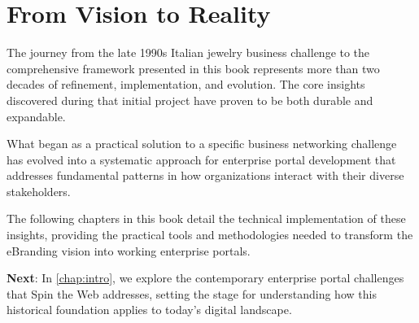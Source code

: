 \section{From Vision to Reality}

The journey from the late 1990s Italian jewelry business challenge to the comprehensive framework presented in this book represents more than two decades of refinement, implementation, and evolution. The core insights discovered during that initial project have proven to be both durable and expandable.

What began as a practical solution to a specific business networking challenge has evolved into a systematic approach for enterprise portal development that addresses fundamental patterns in how organizations interact with their diverse stakeholders.

The following chapters in this book detail the technical implementation of these insights, providing the practical tools and methodologies needed to transform the eBranding vision into working enterprise portals.

\textbf{Next}: In \cref{chap:intro}, we explore the contemporary enterprise portal challenges that Spin the Web addresses, setting the stage for understanding how this historical foundation applies to today's digital landscape.
